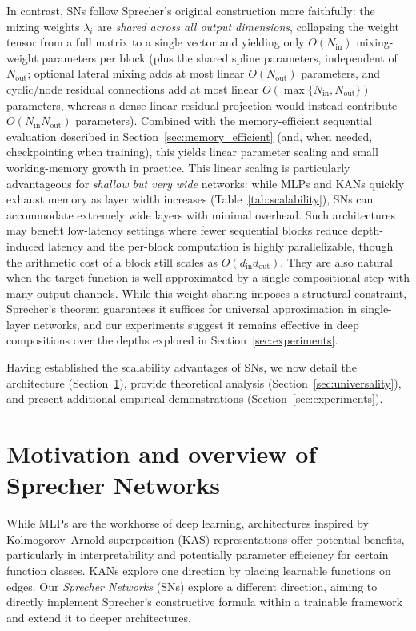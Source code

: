 \documentclass{article}
\theoremstyle{plain}
\theoremstyle{definition}
\theoremstyle{remark}
\begin{document}
In contrast, SNs follow Sprecher's original construction more faithfully: the mixing weights $\lambda_i$ are \emph{shared across all output dimensions}, collapsing the weight tensor from a full matrix to a single vector and yielding only $O(N_{\mathrm{in}})$ mixing-weight parameters per block (plus the shared spline parameters, independent of $N_{\mathrm{out}}$; optional lateral mixing adds at most linear $O(N_{\mathrm{out}})$ parameters, and cyclic/node residual connections add at most linear $O(\max\{N_{\mathrm{in}},N_{\mathrm{out}}\})$ parameters, whereas a dense linear residual projection would instead contribute $O(N_{\mathrm{in}}N_{\mathrm{out}})$ parameters). Combined with the memory-efficient sequential evaluation described in Section~\ref{sec:memory_efficient} (and, when needed, checkpointing when training), this yields linear parameter scaling and small working-memory growth in practice. This linear scaling is particularly advantageous for \emph{shallow but very wide} networks: while MLPs and KANs quickly exhaust memory as layer width increases (Table~\ref{tab:scalability}), SNs can accommodate extremely wide layers with minimal overhead. Such architectures may benefit low-latency settings where fewer sequential blocks reduce depth-induced latency and the per-block computation is highly parallelizable, though the arithmetic cost of a block still scales as $O(d_{\mathrm{in}}d_{\mathrm{out}})$. They are also natural when the target function is well-approximated by a single compositional step with many output channels. While this weight sharing imposes a structural constraint, Sprecher's theorem guarantees it suffices for universal approximation in single-layer networks, and our experiments suggest it remains effective in deep compositions over the depths explored in Section~\ref{sec:experiments}.

\medskip
\noindent Having established the scalability advantages of SNs, we now detail the architecture (Section~\ref{sec:motivation}), provide theoretical analysis (Section~\ref{sec:universality}), and present additional empirical demonstrations (Section~\ref{sec:experiments}).

\section{Motivation and overview of Sprecher Networks}\label{sec:motivation}
While MLPs are the workhorse of deep learning, architectures inspired by Kolmogorov--Arnold superposition (KAS) representations offer potential benefits, particularly in interpretability and potentially parameter efficiency for certain function classes. KANs explore one direction by placing learnable functions on edges. Our \emph{Sprecher Networks} (SNs) explore a different direction, aiming to directly implement Sprecher's constructive formula within a trainable framework and extend it to deeper architectures.
\end{document}
